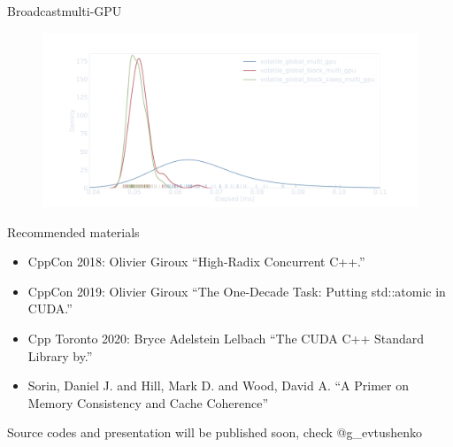\documentclass[aspectratio=169,compress]{beamer}
\begin{document}
\begin{frame}[fragile]{Broadcast}{multi-GPU}
\centering
	\begin{figure}
		\includegraphics[width=\textwidth]{multi_gpu_density.pdf}
	\end{figure}
\end{frame}


\begin{frame}[fragile]{}{}
  Recommended materials
	\begin{itemize}
		\item CppCon 2018: Olivier Giroux ``High-Radix Concurrent C++.''
		\item CppCon 2019: Olivier Giroux ``The One-Decade Task: Putting std::atomic in CUDA.''
		\item Cpp Toronto 2020: Bryce Adelstein Lelbach ``The CUDA C++ Standard Library by.''
		\item Sorin, Daniel J. and Hill, Mark D. and Wood, David A. ``A Primer on Memory Consistency and Cache Coherence''
	\end{itemize}

  \vspace{0.1in}
	Source codes and presentation will be published soon, check \faTwitter @g\_evtushenko
\end{frame}
\end{document}

